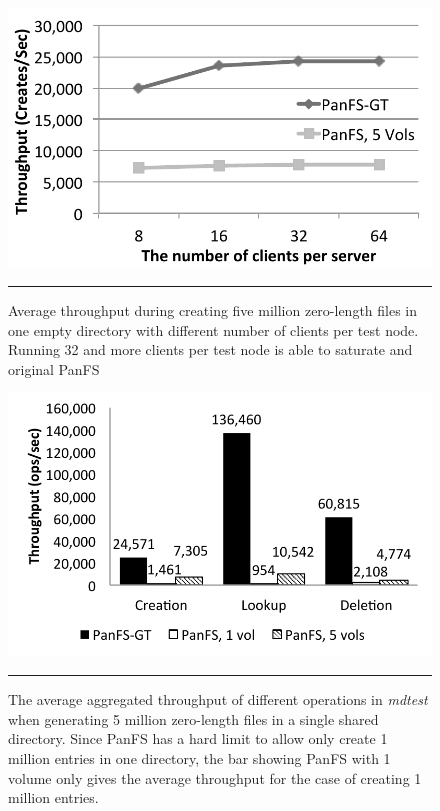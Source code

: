 \begin{figure}[t]  %
\centerline{\includegraphics[scale=0.7]{./figs/zero_file_creation_on_panfs}}
\vspace{10pt}
\caption{\footnotesize
\textsf{Average throughput during creating five million zero-length files
in one empty directory with different number of clients per test node.
Running 32 and more clients per test node is able to saturate \psys
and original PanFS}
}
\hrule
\label{graph:creation_clients}
\end{figure}       %

\begin{figure}[t]  %
\centerline{\includegraphics[scale=0.7]{./figs/mdtest}}
\vspace{10pt}
\caption{\footnotesize
\textsf{
The average aggregated throughput of different operations in {\it mdtest}
when generating 5 million zero-length files in a single shared directory.
Since PanFS has a hard limit to allow only create 1 million entries
in one directory, the bar showing PanFS with 1 volume only gives
the average throughput for the case of creating 1 million entries.
}
}
\hrule
\label{graph:mdtest_ops}
\end{figure}       %


